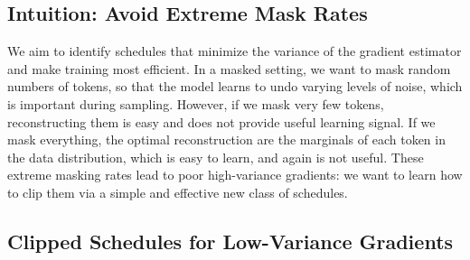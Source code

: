 \documentclass{article} %
\newcommand{\vkl}[1]{\textcolor{blue}{[VK: #1]}}
\newcommand{\TODO}[1]{\textcolor{red}{[TODO: #1]}}
\begin{document}
 \subsection{Intuition: Avoid Extreme Mask Rates}
We aim to identify schedules that minimize the variance of the gradient estimator and make training most efficient. 
%
In a masked setting, we want to mask random numbers of tokens, so that the model learns to undo varying levels of noise, which is important during sampling.
However, if we mask very few tokens, reconstructing them is easy and does not provide useful learning signal. If we mask everything, the optimal reconstruction are the marginals of each token in the data distribution, which is easy to learn, and again is not useful. These extreme masking rates lead to poor high-variance gradients: we want to learn how to clip them via a simple and effective new class of schedules.



\subsection{Clipped Schedules for Low-Variance Gradients}
\end{document}
